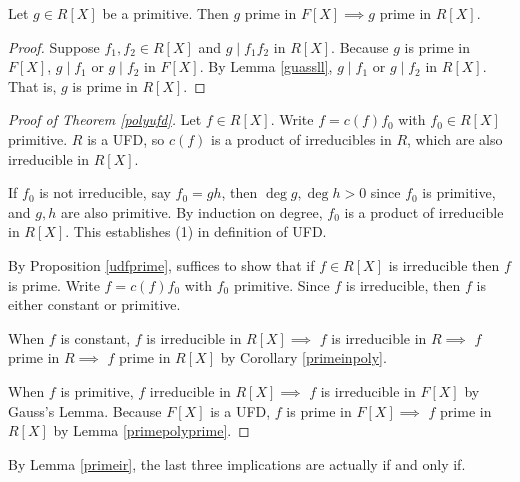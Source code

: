 \begin{lemma}
    \label{primepolyprime}
    Let \(g \in R[X]\) be a primitive. Then \(g\) prime in \(F[X] \implies g\) prime in \(R[X]\).
\end{lemma}
\begin{proof}
    Suppose \(f_1, f_2 \in R[X]\) and \(g \mid f_1 f_2\) in \(R[X]\). Because \(g\) is prime in \(F[X]\), \(g \mid f_1\) or \(g \mid f_2\) in \(F[X]\). By Lemma \eqref{guassll}, \(g \mid f_1\) or \(g \mid f_2\) in \(R[X]\). That is, \(g\) is prime in \(R[X]\).
\end{proof}
\begin{proof}[Proof of Theorem \eqref{polyufd}]
    Let \(f \in R[X]\). Write \(f = c(f) f_0\) with \(f_0\in R[X]\) primitive. \(R\) is a UFD, so \(c(f)\) is a product of irreducibles in \(R\), which are also irreducible in \(R[X]\).

    If \(f_0\) is not irreducible, say \(f_0 = gh\), then \(\deg g, \deg h > 0\) since \(f_0\) is primitive, and \(g, h\) are also primitive. By induction on degree, \(f_0\) is a product of irreducible in \(R[X]\). This establishes (1) in definition of UFD.

    By Proposition \eqref{udfprime}, suffices to show that if \(f\in R[X]\) is irreducible then \(f\) is prime. Write \(f = c(f) f_0\) with \(f_0\) primitive. Since \(f\) is irreducible, then \(f\) is either constant or primitive.

    When \(f\) is constant, \(f\) is irreducible in \(R[X] \implies\) \(f\) is irreducible in \(R\implies\) \(f\) prime in \(R\implies\) \(f\) prime in \(R[X]\) by Corollary \eqref{primeinpoly}.

    When \(f\) is primitive, \(f\) irreducible in \(R[X]\implies \) \(f\) is irreducible in \(F[X]\) by Gauss's Lemma. Because \(F[X]\) is a UFD, \(f\) is prime in \(F[X]\implies\) \(f\) prime in \(R[X]\) by Lemma \eqref{primepolyprime}.
\end{proof}
\begin{remark}
    By Lemma \eqref{primeir}, the last three implications are actually if and only if.
\end{remark}